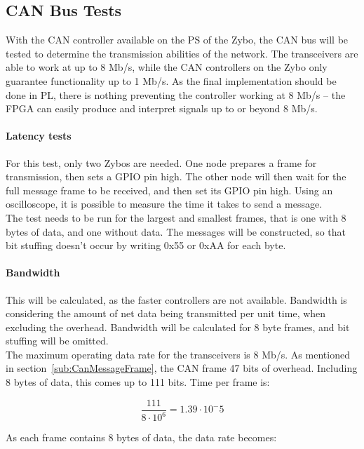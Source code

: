 
\subsection{CAN Bus Tests}
With the CAN controller available on the PS of the Zybo, the CAN bus will be tested to determine the transmission abilities of the network.
The transceivers are able to work at up to 8 Mb/s, while the CAN controllers on the Zybo only guarantee functionality up to 1 Mb/s. 
As the final implementation should be done in PL, there is nothing preventing the controller working at 8 Mb/s -- the FPGA can easily produce and interpret signals up to or beyond 8 Mb/s.

\paragraph{Latency tests}
For this test, only two Zybos are needed.
One node prepares a frame for transmission, then sets a GPIO pin high.
The other node will then wait for the full message frame to be received, and then set its GPIO pin high.
Using an oscilloscope, it is possible to measure the time it takes to send a message.\\

The test needs to be run for the largest and smallest frames, that is one with 8 bytes of data, and one without data. 
The messages will be constructed, so that bit stuffing doesn't occur by writing 0x55 or 0xAA for each byte. 

\paragraph{Bandwidth}
This will be calculated, as the faster controllers are not available.
Bandwidth is considering the amount of net data being transmitted per unit time, when excluding the overhead.
Bandwidth will be calculated for 8 byte frames, and bit stuffing will be omitted.\\

The maximum operating data rate for the transceivers is 8 Mb/s.
As mentioned in section~\ref{sub:CanMessageFrame}, the CAN frame 47 bits of overhead. 
Including 8 bytes of data, this comes up to 111 bits. 
Time per frame is:

\begin{equation}
\frac{111}{8 \cdot 10^6} = 1.39 \cdot 10^-5
\end{equation}

As each frame contains 8 bytes of data, the data rate becomes:

